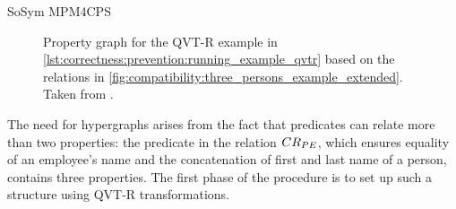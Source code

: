 \begin{copiedFrom}{SoSym MPM4CPS}
\begin{figure}
    \centering
    \resizebox{\linewidth}{!}{}
    \resizebox{\linewidth}{!}{}
    \caption[Property graph for the running example]{Property graph for the QVT-R example in \autoref{lst:correctness:prevention:running_example_qvtr} based on the relations in \autoref{fig:compatibility:three_persons_example_extended}. Taken from .}
    \label{fig:correctness:prevention:propertygraph_re}
\end{figure}


The need for hypergraphs arises from the fact that predicates can relate more than two properties: the predicate in the relation $CR_{PE}$, which ensures equality of an employee's name and the concatenation of first and last name of a person, contains three properties.
The first phase of the procedure is to set up such a structure using QVT-R transformations. 




\end{copiedFrom}
